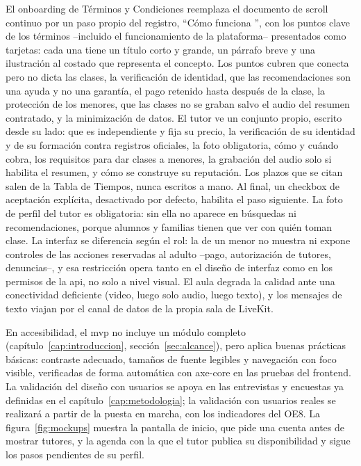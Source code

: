 El onboarding de Términos y Condiciones reemplaza el documento de scroll
continuo por un paso propio del registro, ``Cómo funciona \sistema{}'', con
los puntos clave de los términos --incluido el funcionamiento de la
plataforma-- presentados como tarjetas: cada una tiene un título corto y
grande, un párrafo breve y una ilustración al costado que representa el
concepto. Los puntos cubren que \sistema{} conecta pero no dicta las
clases, la verificación de identidad, que las recomendaciones son una ayuda
y no una garantía, el pago retenido hasta después de la clase, la
protección de los menores, que las clases no se graban salvo el audio del
resumen contratado, y la minimización de datos. El tutor ve un conjunto propio, escrito
desde su lado: que es independiente y fija su precio, la verificación de su
identidad y de su formación contra registros oficiales, la foto
obligatoria, cómo y cuándo cobra, los requisitos para dar clases a menores,
la grabación del audio solo si habilita el resumen, y cómo se construye su
reputación. Los plazos
que se citan salen de la Tabla de Tiempos, nunca escritos a mano. Al final,
un checkbox de aceptación explícita, desactivado por defecto, habilita el
paso siguiente. La foto de perfil del tutor es obligatoria: sin ella no
aparece en búsquedas ni recomendaciones, porque alumnos y familias tienen
que ver con quién toman clase. La interfaz se diferencia según el rol:
la de un menor no muestra ni expone controles de las acciones
reservadas al adulto --pago, autorización de tutores, denuncias--, y esa
restricción opera tanto en el diseño de interfaz como en los permisos de
la \gls{api}, no solo a nivel visual. El aula degrada la calidad ante una
conectividad deficiente (video, luego solo audio, luego texto), y los
mensajes de texto viajan por el canal de datos de la propia sala de
LiveKit.

En accesibilidad, el \gls{mvp} no incluye un módulo completo
(capítulo~\ref{cap:introduccion}, sección~\ref{sec:alcance}), pero aplica
buenas prácticas básicas: contraste adecuado, tamaños de fuente legibles
y navegación con foco visible, verificadas de forma automática con
axe-core en las pruebas del frontend. La validación del diseño con
usuarios se apoya en las entrevistas y encuestas ya definidas en el
capítulo~\ref{cap:metodologia}; la validación con usuarios reales se
realizará a partir de la puesta en marcha, con los indicadores del OE8. La figura~\ref{fig:mockups} muestra la pantalla de inicio, que
pide una cuenta antes de mostrar tutores, y la agenda con la que el tutor
publica su disponibilidad y sigue los pasos pendientes de su perfil.

